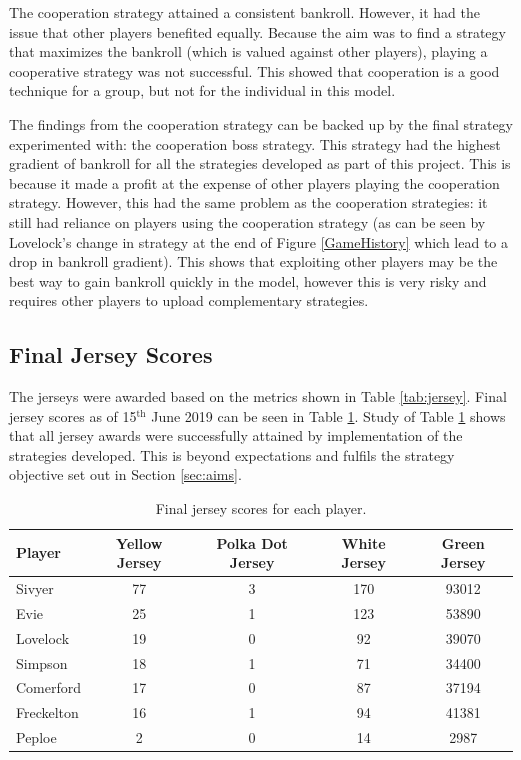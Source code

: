 \documentclass[11pt, twoside]{article}
\begin{document}
The cooperation strategy attained a consistent bankroll. However, it had the issue that other players benefited equally. Because the aim was to find a strategy that maximizes the bankroll (which is valued against other players), playing a cooperative strategy was not successful. This showed that cooperation is a good technique for a group, but not for the individual in this model.

The findings from the cooperation strategy can be backed up by the final strategy experimented with: the cooperation boss strategy. This strategy had the highest gradient of bankroll for all the strategies developed as part of this project. This is because it made a profit at the expense of other players playing the cooperation strategy. However, this had the same problem as the cooperation strategies: it still had reliance on players using the cooperation strategy (as can be seen by Lovelock's change in strategy at the end of Figure \ref{GameHistory} which lead to a drop in bankroll gradient). This shows that exploiting other players may be the best way to gain bankroll quickly in the model, however this is very risky and requires other players to upload complementary strategies.

\subsection{Final Jersey Scores}

The jerseys were awarded based on the metrics shown in Table \ref{tab:jersey}. Final jersey scores as of 15$^{\text{th}}$ June 2019 can be seen in Table \ref{tab:JerseyFinals}. Study of Table \ref{tab:JerseyFinals} shows that all jersey awards were successfully attained by implementation of the strategies developed. This is beyond expectations and fulfils the strategy objective set out in Section \ref{sec:aims}.

\begin{table}[t!]
	\centering
	\caption{Final jersey scores for each player.}
	\label{tab:JerseyFinals}
	\begin{tabular}{lcccc}
		\toprule
		\textbf{Player} & \textbf{Yellow Jersey} & \textbf{Polka Dot Jersey} & \textbf{White Jersey} & \textbf{Green Jersey}\\
		\midrule
		Sivyer & 77 & 3 & 170 & 93012\\
		Evie & 25 & 1 & 123 & 53890\\
		Lovelock & 19 & 0 & 92 & 39070\\
		Simpson & 18 & 1 & 71 & 34400\\
		Comerford & 17 & 0 & 87 & 37194\\
		Freckelton & 16 & 1 & 94 & 41381\\
		Peploe & 2 & 0 & 14 & 2987\\
		\bottomrule
	\end{tabular}
\end{table}
\end{document}
